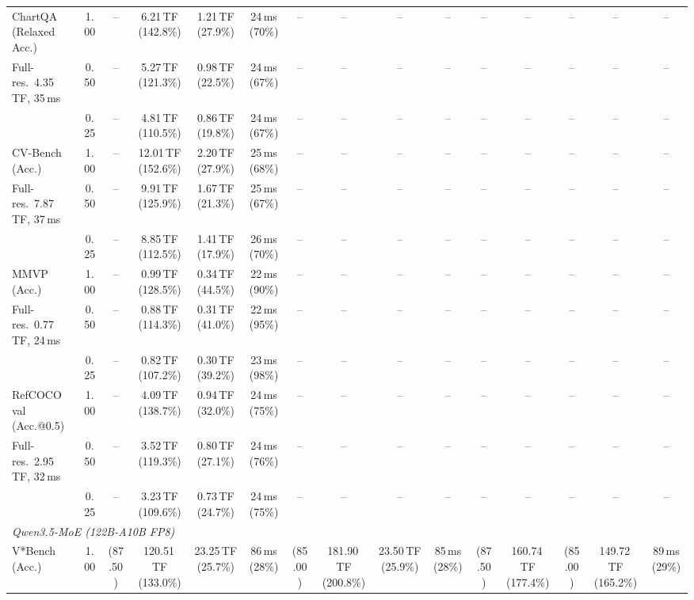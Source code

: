 \begin{table}[t]
{\begin{tabular}{l c | c c c c | c c c c | c c | c c c}
\cmidrule(lr){1-15}
ChartQA (Relaxed Acc.) & 1.00 & -- & 6.21\,TF (142.8\%) & 1.21\,TF (27.9\%) & 24\,ms (70\%) & -- & -- & -- & -- & -- & -- & -- & -- & -- \\
{\footnotesize Full-res.\ 4.35\,TF, 35\,ms} & 0.50 & -- & 5.27\,TF (121.3\%) & 0.98\,TF (22.5\%) & 24\,ms (67\%) & -- & -- & -- & -- & -- & -- & -- & -- & -- \\
 & 0.25 & -- & 4.81\,TF (110.5\%) & 0.86\,TF (19.8\%) & 24\,ms (67\%) & -- & -- & -- & -- & -- & -- & -- & -- & -- \\
\cmidrule(lr){1-15}
CV-Bench (Acc.) & 1.00 & -- & 12.01\,TF (152.6\%) & 2.20\,TF (27.9\%) & 25\,ms (68\%) & -- & -- & -- & -- & -- & -- & -- & -- & -- \\
{\footnotesize Full-res.\ 7.87\,TF, 37\,ms} & 0.50 & -- & 9.91\,TF (125.9\%) & 1.67\,TF (21.3\%) & 25\,ms (67\%) & -- & -- & -- & -- & -- & -- & -- & -- & -- \\
 & 0.25 & -- & 8.85\,TF (112.5\%) & 1.41\,TF (17.9\%) & 26\,ms (70\%) & -- & -- & -- & -- & -- & -- & -- & -- & -- \\
\cmidrule(lr){1-15}
MMVP (Acc.) & 1.00 & -- & 0.99\,TF (128.5\%) & 0.34\,TF (44.5\%) & 22\,ms (90\%) & -- & -- & -- & -- & -- & -- & -- & -- & -- \\
{\footnotesize Full-res.\ 0.77\,TF, 24\,ms} & 0.50 & -- & 0.88\,TF (114.3\%) & 0.31\,TF (41.0\%) & 22\,ms (95\%) & -- & -- & -- & -- & -- & -- & -- & -- & -- \\
 & 0.25 & -- & 0.82\,TF (107.2\%) & 0.30\,TF (39.2\%) & 23\,ms (98\%) & -- & -- & -- & -- & -- & -- & -- & -- & -- \\
\cmidrule(lr){1-15}
RefCOCO val (Acc.@0.5) & 1.00 & -- & 4.09\,TF (138.7\%) & 0.94\,TF (32.0\%) & 24\,ms (75\%) & -- & -- & -- & -- & -- & -- & -- & -- & -- \\
{\footnotesize Full-res.\ 2.95\,TF, 32\,ms} & 0.50 & -- & 3.52\,TF (119.3\%) & 0.80\,TF (27.1\%) & 24\,ms (76\%) & -- & -- & -- & -- & -- & -- & -- & -- & -- \\
 & 0.25 & -- & 3.23\,TF (109.6\%) & 0.73\,TF (24.7\%) & 24\,ms (75\%) & -- & -- & -- & -- & -- & -- & -- & -- & -- \\
\midrule
\multicolumn{15}{l}{\emph{Qwen3.5-MoE (122B-A10B FP8)}} \\
V*Bench (Acc.) & 1.00 & (87.50) & 120.51\,TF (133.0\%) & 23.25\,TF (25.7\%) & 86\,ms (28\%) & (85.00) & 181.90\,TF (200.8\%) & 23.50\,TF (25.9\%) & 85\,ms (28\%) & (87.50) & 160.74\,TF (177.4\%) & (85.00) & 149.72\,TF (165.2\%) & 89\,ms (29\%) \\

\end{tabular}}
\end{table}
